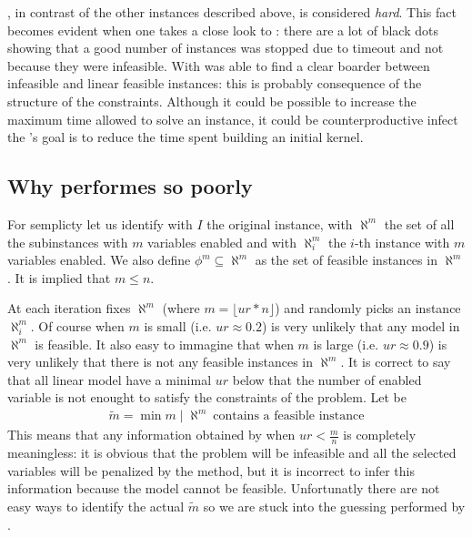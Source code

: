 
\Instance{}, in contrast of the other instances described above, is considered \emph{hard}. This fact becomes evident when one
takes a close look to \Figure{}: there are a lot of black dots showing that a good number of instances was stopped due to  timeout and
not because they were infeasible. With \Instance{} \fk{} was able to find a clear boarder between infeasible and linear feasible 
instances: this is probably consequence of the structure of the constraints. Although it could be possible to increase the 
maximum time allowed to solve an instance, it could be counterproductive infect the \fk's goal is to reduce the time spent 
building an initial kernel. 


\newcommand{\SM}{\aleph^{m}}
\subsection{Why \fk{} performes so poorly}
For semplicty let us identify with $I$ the original instance, with  $\SM$ the set of 
all the subinstances with $m$ variables enabled and with $\SM_{i}$ the $i$-th instance 
with $m$ variables enabled. We also define $\phi^{m} \subseteq \SM $ as the set of feasible instances
in $\SM$. 
It is implied that $m \leq n$.

At each iteration \fk{} fixes $\SM$ (where $m = \lfloor ur * n \rfloor$) and randomly picks an
instance $\SM_{i}$. Of course when $m$ is small (i.e. $ur \approx 0.2$) is very unlikely that any 
model in $\SM$ is feasible. 
It also easy to immagine that when $m$ is large (i.e. $ur \approx 0.9$) is very unlikely
that there is not any feasible instances in $\SM$. It is correct to say that all linear model have a minimal $ur$ below that 
the number of enabled variable is not enought to satisfy the constraints of the problem. Let be
\begin{align*}
    \tilde{m} = \min m \mid \SM{}\ \text{contains a feasible instance} \label{eq:min-m}
\end{align*}
This means that any information obtained by \fk{} when $ur < \frac{m}{n}$ is completely meaningless: it is obvious 
that the problem will be infeasible and all the selected variables will be penalized by the method, but it is incorrect 
to infer this information because the model cannot be feasible. 
Unfortunatly there are not easy ways to identify the actual $\tilde{m}$ so we are stuck into the guessing performed by 
\fk{}.


